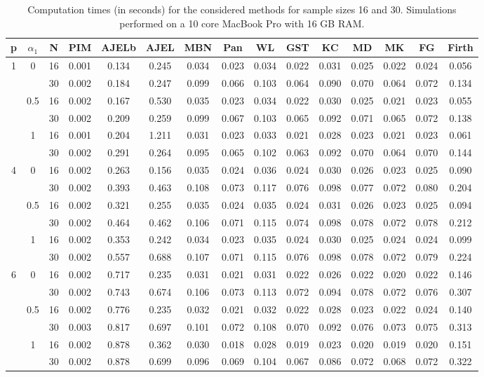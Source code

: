 \documentclass[num-refs]{wiley-article}
\begin{document}
\begin{table}
\caption{Computation times (in seconds) for the considered methods for sample sizes 16 and 30. Simulations performed on a 10 core MacBook Pro with 16 GB RAM.}
\centering
\scriptsize
\begin{tabular}[t]{ccccccccccccccc}
\hline
p&$\alpha_1$&N & PIM & AJELb & AJEL & MBN & Pan & WL & GST & KC & MD & MK & FG & Firth\\
\hline
1&0&16 & 0.001 & 0.134 & 0.245 & 0.034 & 0.023 & 0.034 & 0.022 & 0.031 & 0.025 & 0.022 & 0.024 & 0.056\\
&&30 & 0.002 & 0.184 & 0.247 & 0.099 & 0.066 & 0.103 & 0.064 & 0.090 & 0.070 & 0.064 & 0.072 & 0.134\\
\hline
&0.5&16 & 0.002 & 0.167 & 0.530 & 0.035 & 0.023 & 0.034 & 0.022 & 0.030 & 0.025 & 0.021 & 0.023 & 0.055\\
&&30 & 0.002 & 0.209 & 0.259 & 0.099 & 0.067 & 0.103 & 0.065 & 0.092 & 0.071 & 0.065 & 0.072 & 0.138\\
\hline
&1&16 & 0.001 & 0.204 & 1.211 & 0.031 & 0.023 & 0.033 & 0.021 & 0.028 & 0.023 & 0.021 & 0.023 & 0.061\\
&&30 & 0.002 & 0.291 & 0.264 & 0.095 & 0.065 & 0.102 & 0.063 & 0.092 & 0.070 & 0.064 & 0.070 & 0.144\\
\hline
4&0&16 & 0.002 & 0.263 & 0.156 & 0.035 & 0.024 & 0.036 & 0.024 & 0.030 & 0.026 & 0.023 & 0.025 & 0.090\\
&&30 & 0.002 & 0.393 & 0.463 & 0.108 & 0.073 & 0.117 & 0.076 & 0.098 & 0.077 & 0.072 & 0.080 & 0.204\\
\hline
&0.5&16 & 0.002 & 0.321 & 0.255 & 0.035 & 0.024 & 0.035 & 0.024 & 0.031 & 0.026 & 0.023 & 0.025 & 0.094\\
&&30 & 0.002 & 0.464 & 0.462 & 0.106 & 0.071 & 0.115 & 0.074 & 0.098 & 0.078 & 0.072 & 0.078 & 0.212\\
\hline
&1&16 & 0.002 & 0.353 & 0.242 & 0.034 & 0.023 & 0.035 & 0.024 & 0.030 & 0.025 & 0.024 & 0.024 & 0.099\\
&&30 & 0.002 & 0.557 & 0.688 & 0.107 & 0.071 & 0.115 & 0.076 & 0.098 & 0.078 & 0.072 & 0.079 & 0.224\\
\hline
6&0&16 & 0.002 & 0.717 & 0.235 & 0.031 & 0.021 & 0.031 & 0.022 & 0.026 & 0.022 & 0.020 & 0.022 & 0.146\\
&&30 & 0.002 & 0.743 & 0.674 & 0.106 & 0.073 & 0.113 & 0.072 & 0.094 & 0.078 & 0.072 & 0.076 & 0.307\\
\hline
&0.5&16 & 0.002 & 0.776 & 0.235 & 0.032 & 0.021 & 0.032 & 0.022 & 0.028 & 0.023 & 0.022 & 0.024 & 0.140\\
&&30 & 0.003 & 0.817 & 0.697 & 0.101 & 0.072 & 0.108 & 0.070 & 0.092 & 0.076 & 0.073 & 0.075 & 0.313\\
\hline
&1&16 & 0.002 & 0.878 & 0.362 & 0.030 & 0.018 & 0.028 & 0.019 & 0.023 & 0.020 & 0.019 & 0.020 & 0.151\\
&&30 & 0.002 & 0.878 & 0.699 & 0.096 & 0.069 & 0.104 & 0.067 & 0.086 & 0.072 & 0.068 & 0.072 & 0.322\\
\hline
\end{tabular}
\label{tab:times}
\end{table}

\newpage

\end{document}
